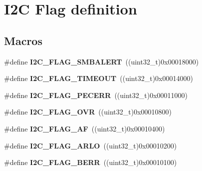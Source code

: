 \hypertarget{group___i2_c___flag__definition}{}\section{I2C Flag definition}
\label{group___i2_c___flag__definition}
\subsection*{Macros}
\begin{DoxyCompactItemize}
\item 
\#define {\bfseries I2\+C\+\_\+\+F\+L\+A\+G\+\_\+\+S\+M\+B\+A\+L\+E\+RT}~((uint32\+\_\+t)0x00018000)\hypertarget{group___i2_c___flag__definition_ga4e1d7cd1574d03ba501c27483300c1be}{}\label{group___i2_c___flag__definition_ga4e1d7cd1574d03ba501c27483300c1be}

\item 
\#define {\bfseries I2\+C\+\_\+\+F\+L\+A\+G\+\_\+\+T\+I\+M\+E\+O\+UT}~((uint32\+\_\+t)0x00014000)\hypertarget{group___i2_c___flag__definition_ga89c8d5d8ccc77a8619fafe9b39d1cc74}{}\label{group___i2_c___flag__definition_ga89c8d5d8ccc77a8619fafe9b39d1cc74}

\item 
\#define {\bfseries I2\+C\+\_\+\+F\+L\+A\+G\+\_\+\+P\+E\+C\+E\+RR}~((uint32\+\_\+t)0x00011000)\hypertarget{group___i2_c___flag__definition_ga6c7addb6413f165f42bcc87506ea8467}{}\label{group___i2_c___flag__definition_ga6c7addb6413f165f42bcc87506ea8467}

\item 
\#define {\bfseries I2\+C\+\_\+\+F\+L\+A\+G\+\_\+\+O\+VR}~((uint32\+\_\+t)0x00010800)\hypertarget{group___i2_c___flag__definition_gab579673c8ac920db199aa7f18e547fb3}{}\label{group___i2_c___flag__definition_gab579673c8ac920db199aa7f18e547fb3}

\item 
\#define {\bfseries I2\+C\+\_\+\+F\+L\+A\+G\+\_\+\+AF}~((uint32\+\_\+t)0x00010400)\hypertarget{group___i2_c___flag__definition_ga2f89dbba9b964e6ade1480705e7a97d4}{}\label{group___i2_c___flag__definition_ga2f89dbba9b964e6ade1480705e7a97d4}

\item 
\#define {\bfseries I2\+C\+\_\+\+F\+L\+A\+G\+\_\+\+A\+R\+LO}~((uint32\+\_\+t)0x00010200)\hypertarget{group___i2_c___flag__definition_gae1e67936f4780e42b8bbe04ac9c20a7b}{}\label{group___i2_c___flag__definition_gae1e67936f4780e42b8bbe04ac9c20a7b}

\item 
\#define {\bfseries I2\+C\+\_\+\+F\+L\+A\+G\+\_\+\+B\+E\+RR}~((uint32\+\_\+t)0x00010100)\hypertarget{group___i2_c___flag__definition_ga0454176b6ddd5c402abc3ef5953a21ad}{}\label{group___i2_c___flag__definition_ga0454176b6ddd5c402abc3ef5953a21ad}


\end{DoxyCompactItemize}
